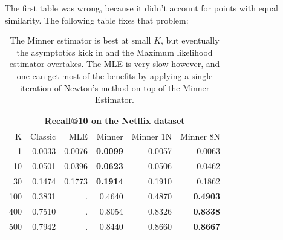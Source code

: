 %

The first table was wrong, because it didn't account for points with equal similarity.
The following table fixes that problem:
\begin{table}
\centering
 \begin{tabular}{|r| r r r r r|} 
 \hline
     \multicolumn{6}{|c|}{Recall@10 on the Netflix dataset} \\
 \hline
 K  & Classic & MLE & Minner & Minner 1N & Minner 8N \\
 \hline
    1 & 0.0033 & 0.0076 & \textbf{ 0.0099} & 0.0057 & 0.0063 \\
  10 & 0.0501 & 0.0396 & \textbf{ 0.0623} & 0.0506 & 0.0462 \\
  30 & 0.1474 & 0.1773 & \textbf{ 0.1914} & 0.1910 & 0.1862 \\
 100 & 0.3831 &      . & 0.4640 & 0.4870 & \textbf{ 0.4903} \\
 400 & 0.7510 &      . & 0.8054 & 0.8326 & \textbf{ 0.8338} \\
 500 & 0.7942 &      . & 0.8440 & 0.8660 & \textbf{ 0.8667} \\
  \hline
 \end{tabular}
 \caption{The Minner estimator is best at small $K$, but eventually the asymptotics kick in and the Maximum likelihood estimator overtakes. The MLE is very slow however, and one can get most of the benefits by applying a single iteration of Newton's method on top of the Minner Estimator.}
 \label{tab:netflix}
\end{table}

